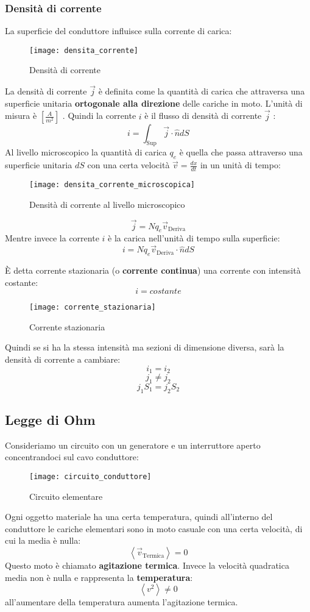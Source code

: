 \documentclass[a4paper]{article}
\begin{document}
\subsubsection{Densità di corrente}
\begin{example}
  La superficie del conduttore influisce sulla corrente di carica:
  \begin{figure}[H]
    \centering
    \texttt{[image: densita\_corrente]}
    \caption{Densità di corrente}
  \end{figure}
\end{example}
La densità di corrente \( \vec{j} \) è definita come la quantità di carica che attraversa
una superficie unitaria \textbf{ortogonale alla direzione} delle cariche in moto.
L'unità di misura è \( \left[ \frac{A}{m^2} \right] \) . Quindi la corrente \( i \)  è il flusso
di densità di corrente \( \vec{j} \) :
\[
  i = \int_{\text{Sup}} \vec{j} \cdot \hat{n} dS
\]
Al livello microscopico la quantità di carica \( q_e \)  è quella che passa attraverso una superficie
unitaria \( dS \) con una certa velocità \( \vec{v} = \frac{dx}{dt} \) in un unità di tempo:
\begin{figure}[H]
  \centering
  \texttt{[image: densita\_corrente\_microscopica]}
  \caption{Densità di corrente al livello microscopico}
\end{figure}
\[
  \vec{j} = N q_e \vec{v}_{\text{Deriva}}
\] 
Mentre invece la corrente \( i \) è la carica nell'unità di tempo sulla superficie:
\[
  i = N q_e \vec{v}_{\text{Deriva}} \cdot \hat{n} dS
\] 

\vspace{1em}
\noindent
È detta corrente stazionaria (o \textbf{corrente continua}) una corrente con intensità 
costante:
\[
   i = costante
\] 
\begin{figure}[H]
  \centering
  \texttt{[image: corrente\_stazionaria]}
  \caption{Corrente stazionaria}
\end{figure}
\noindent
Quindi se si ha la stessa intensità ma sezioni di dimensione diversa, sarà la densità
di corrente a cambiare:
\[
  i_1 = i_2
\] 
\[
  j_1 \neq j_2
\] 
\[
  j_1 S_1 = j_2 S_2
\] 

\subsection{Legge di Ohm}
Consideriamo un circuito con un generatore e un interruttore aperto concentrandoci sul cavo conduttore:
\begin{figure}[H]
  \centering
  \texttt{[image: circuito\_conduttore]}
  \caption{Circuito elementare}
\end{figure}
\noindent
Ogni oggetto materiale ha una certa temperatura, quindi all'interno del conduttore le
cariche elementari sono in moto casuale con una certa velocità, di cui la media è nulla:
\[
  \left< \vec{v}_{\text{Termica}} \right> = 0
\] 
Questo moto è chiamato \textbf{agitazione termica}. Invece la velocità quadratica
media non è nulla e rappresenta la \textbf{temperatura}:
\[
  \left< v^2 \right> \neq 0
\] 
all'aumentare della temperatura aumenta l'agitazione termica.
\end{document}
